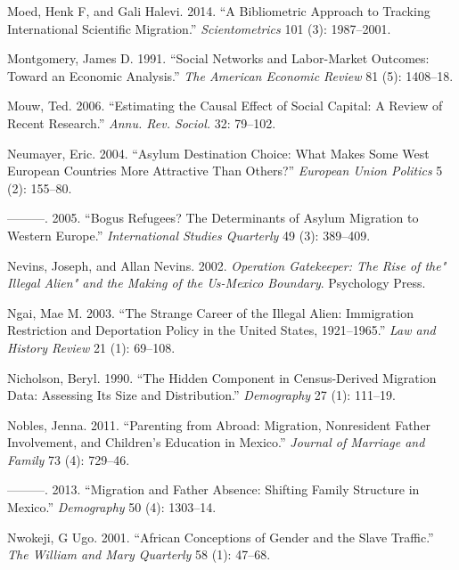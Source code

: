 \documentclass[
]{article}
\begin{document}
\leavevmode\hypertarget{ref-moed2014bibliometric}{}%
Moed, Henk F, and Gali Halevi. 2014. ``A Bibliometric Approach to
Tracking International Scientific Migration.'' \emph{Scientometrics} 101
(3): 1987--2001.

\leavevmode\hypertarget{ref-montgomery1991}{}%
Montgomery, James D. 1991. ``Social Networks and Labor-Market Outcomes:
Toward an Economic Analysis.'' \emph{The American Economic Review} 81
(5): 1408--18.

\leavevmode\hypertarget{ref-mouw2006estimating}{}%
Mouw, Ted. 2006. ``Estimating the Causal Effect of Social Capital: A
Review of Recent Research.'' \emph{Annu. Rev. Sociol.} 32: 79--102.

\leavevmode\hypertarget{ref-neumayer2004asylum}{}%
Neumayer, Eric. 2004. ``Asylum Destination Choice: What Makes Some West
European Countries More Attractive Than Others?'' \emph{European Union
Politics} 5 (2): 155--80.

\leavevmode\hypertarget{ref-neumayer2005bogus}{}%
---------. 2005. ``Bogus Refugees? The Determinants of Asylum Migration
to Western Europe.'' \emph{International Studies Quarterly} 49 (3):
389--409.

\leavevmode\hypertarget{ref-nevins2002operation}{}%
Nevins, Joseph, and Allan Nevins. 2002. \emph{Operation Gatekeeper: The
Rise of the" Illegal Alien" and the Making of the Us-Mexico Boundary}.
Psychology Press.

\leavevmode\hypertarget{ref-ngai2003strange}{}%
Ngai, Mae M. 2003. ``The Strange Career of the Illegal Alien:
Immigration Restriction and Deportation Policy in the United States,
1921--1965.'' \emph{Law and History Review} 21 (1): 69--108.

\leavevmode\hypertarget{ref-nicholson1990hidden}{}%
Nicholson, Beryl. 1990. ``The Hidden Component in Census-Derived
Migration Data: Assessing Its Size and Distribution.'' \emph{Demography}
27 (1): 111--19.

\leavevmode\hypertarget{ref-nobles2011parenting}{}%
Nobles, Jenna. 2011. ``Parenting from Abroad: Migration, Nonresident
Father Involvement, and Children's Education in Mexico.'' \emph{Journal
of Marriage and Family} 73 (4): 729--46.

\leavevmode\hypertarget{ref-nobles2013migration}{}%
---------. 2013. ``Migration and Father Absence: Shifting Family
Structure in Mexico.'' \emph{Demography} 50 (4): 1303--14.

\leavevmode\hypertarget{ref-nwokeji2001african}{}%
Nwokeji, G Ugo. 2001. ``African Conceptions of Gender and the Slave
Traffic.'' \emph{The William and Mary Quarterly} 58 (1): 47--68.
\end{document}
